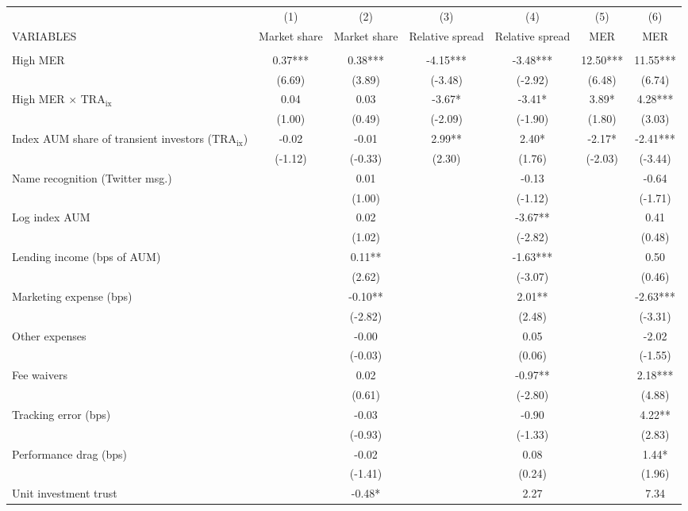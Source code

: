 \documentclass[]{article}
\begin{document}
\begin{tabular}{lcccccc} \hline
 & (1) & (2) & (3) & (4) & (5) & (6) \\
VARIABLES & Market share & Market share & Relative spread & Relative spread & MER & MER \\ \hline
 &  &  &  &  &  &  \\
High MER & 0.37*** & 0.38*** & -4.15*** & -3.48*** & 12.50*** & 11.55*** \\
 & (6.69) & (3.89) & (-3.48) & (-2.92) & (6.48) & (6.74) \\
High MER $\times$ $\text{TRA}_\text{ix}$ & 0.04 & 0.03 & -3.67* & -3.41* & 3.89* & 4.28*** \\
 & (1.00) & (0.49) & (-2.09) & (-1.90) & (1.80) & (3.03) \\
Index AUM share of transient investors ($\text{TRA}_\text{ix}$) & -0.02 & -0.01 & 2.99** & 2.40* & -2.17* & -2.41*** \\
 & (-1.12) & (-0.33) & (2.30) & (1.76) & (-2.03) & (-3.44) \\
Name recognition (Twitter msg.) &  & 0.01 &  & -0.13 &  & -0.64 \\
 &  & (1.00) &  & (-1.12) &  & (-1.71) \\
Log index AUM &  & 0.02 &  & -3.67** &  & 0.41 \\
 &  & (1.02) &  & (-2.82) &  & (0.48) \\
Lending income (bps of AUM) &  & 0.11** &  & -1.63*** &  & 0.50 \\
 &  & (2.62) &  & (-3.07) &  & (0.46) \\
Marketing expense (bps) &  & -0.10** &  & 2.01** &  & -2.63*** \\
 &  & (-2.82) &  & (2.48) &  & (-3.31) \\
Other expenses &  & -0.00 &  & 0.05 &  & -2.02 \\
 &  & (-0.03) &  & (0.06) &  & (-1.55) \\
Fee waivers &  & 0.02 &  & -0.97** &  & 2.18*** \\
 &  & (0.61) &  & (-2.80) &  & (4.88) \\
Tracking error (bps) &  & -0.03 &  & -0.90 &  & 4.22** \\
 &  & (-0.93) &  & (-1.33) &  & (2.83) \\
Performance drag (bps) &  & -0.02 &  & 0.08 &  & 1.44* \\
 &  & (-1.41) &  & (0.24) &  & (1.96) \\
Unit investment trust &  & -0.48* &  & 2.27 &  & 7.34 \\

\end{tabular}
\end{document}

